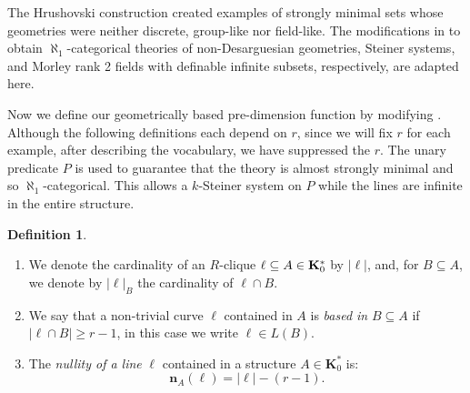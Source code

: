 \documentclass[11pt]{amsart}
\def\BB{\mathcal{B}}
\def\UU{\mathcal{U}}
\def\bK{{\bf K}}
\def\bL{{\bf L}}
\def\bU{{\bf U}}
\theoremstyle{definition}
\newtheorem{definition}[theorem]{Definition}
\theoremstyle{remark}
\numberwithin{equation}{section}
\begin{document}


The Hrushovski construction \cite{Hrustrongmin} created examples of strongly
minimal sets whose geometries were neither discrete, group-like nor
field-like. The modifications in \cite{Baldwinasmpp,  BaldwinPao,
BaldwinHolland} to obtain $\aleph_1$-categorical theories of non-Desarguesian
geometries, Steiner systems, and Morley rank 2 fields with definable infinite
subsets, respectively, are adapted here.













Now we define our geometrically based pre-dimension function by modifying
\cite{BaldwinPao}. Although the following definitions each depend on $r$,
since we will fix $r$ for each example, after describing the vocabulary, we
have suppressed the $r$.
 The unary predicate $P$ is used to guarantee that the theory is almost strongly minimal
 and so $\aleph_1$-categorical. This allows a $k$-Steiner system on $P$ while
 the lines are infinite in the entire structure.
 
 \begin{definition}\label{lines}
 \begin{enumerate}
 \item  We denote the cardinality of an $R$-clique $\ell \subseteq A \in
     \bK^*_0 $ by $|\ell|$, and, for $B \subseteq A$, we denote by
     $|\ell|_B$ the cardinality of $\ell \cap B$.
   \item We say that a non-trivial curve $\ell$ contained in $A$ is {\em
       based in} $B \subseteq A$ if $|\ell\cap B| \geq r-1$, in this case we
       write $\ell \in L(B)$.
\item	\label{nullity} The {\em nullity of a line} $\ell$ contained in a
    structure $A \in \mathbf{K}^*_0$ is:
	$$\mathbf{n}_A(\ell) = |\ell| - (r-1).$$

\end{enumerate}
\end{definition}
\end{document}
